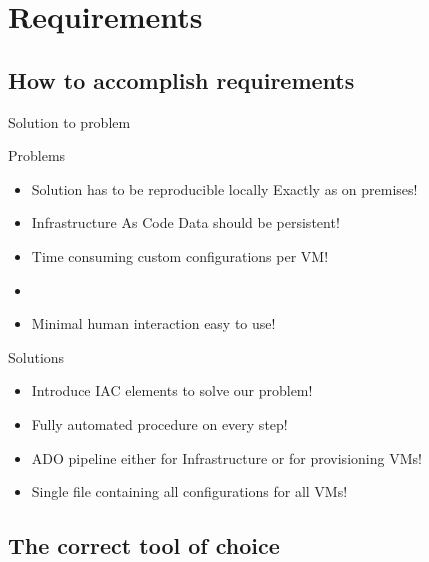 \section{Requirements}\label{sec:requirements}
\subsection{How to accomplish requirements}\label{subsec:how-to-accomplish-requirements}

\begin{frame}{Solution to problem}
	\begin{alertblock}{Problems}
		\begin{itemize}
			\item<1-| alert@1> Solution has to be reproducible locally \alert{Exactly as on premises}!
			\item<2-| alert@2> \alert{Infrastructure As Code} Data should be persistent!
			\item<3-| alert@3> \alert{Time consuming} custom configurations per VM!
			\item<4-| alert@4> \item Minimal human interaction \alert{easy to use}!
		\end{itemize}	
	\end{alertblock}
	\begin{exampleblock}{Solutions}
		\begin{itemize}
			\item<1-| alert@1> Introduce IAC elements to solve our problem!
			\item<2-| alert@2> Fully \alert{automated procedure} on every step!
			\item<3-| alert@3> \alert{ADO pipeline} either for Infrastructure or for provisioning VMs!
			\item<4-| alert@4> \alert{Single file} containing all configurations for all VMs!
		\end{itemize}	
	\end{exampleblock}
\end{frame}

\subsection{The correct tool of choice}\label{subsec:the-correct-tool-of-choice}

